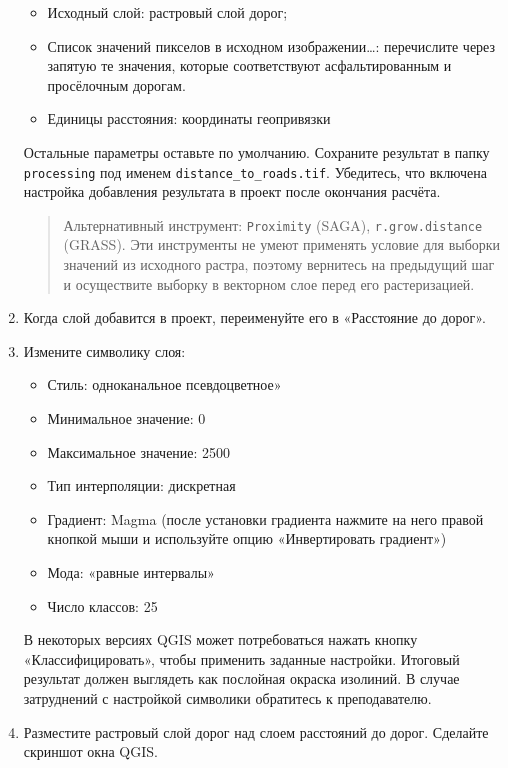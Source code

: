 \documentclass[
  12pt,
]{book}
\providecommand{\tightlist}{%
  \setlength{\itemsep}{0pt}\setlength{\parskip}{0pt}}
\begin{document}
\begin{enumerate}
  \begin{itemize}
  \item
    Исходный слой: растровый слой дорог;
  \item
    Список значений пикселов в исходном изображении\ldots: перечислите через запятую те значения, которые соответствуют асфальтированным и просёлочным дорогам.
  \item
    Единицы расстояния: координаты геопривязки
  \end{itemize}

  Остальные параметры оставьте по умолчанию. Сохраните результат в папку \texttt{processing} под именем \texttt{distance\_to\_roads.tif}. Убедитесь, что включена настройка добавления результата в проект после окончания расчёта.

  \begin{quote}
  Альтернативный инструмент: \texttt{Proximity} (SAGA), \texttt{r.grow.distance} (GRASS). Эти инструменты не умеют применять условие для выборки значений из исходного растра, поэтому вернитесь на предыдущий шаг и осуществите выборку в векторном слое перед его растеризацией.
  \end{quote}
\item
  Когда слой добавится в проект, переименуйте его в «Расстояние до дорог».
\item
  Измените символику слоя:

  \begin{itemize}
  \tightlist
  \item
    Стиль: одноканальное псевдоцветное»
  \item
    Минимальное значение: 0
  \item
    Максимальное значение: 2500
  \item
    Тип интерполяции: дискретная
  \item
    Градиент: Magma (после установки градиента нажмите на него правой кнопкой мыши и используйте опцию «Инвертировать градиент»)
  \item
    Мода: «равные интервалы»
  \item
    Число классов: 25
  \end{itemize}

  В некоторых версиях QGIS может потребоваться нажать кнопку «Классифицировать», чтобы применить заданные настройки. Итоговый результат должен выглядеть как послойная окраска изолиний. В случае затруднений с настройкой символики обратитесь к преподавателю.
\item
  Разместите растровый слой дорог над слоем расстояний до дорог. Сделайте скриншот окна QGIS.
\end{enumerate}
\end{document}
